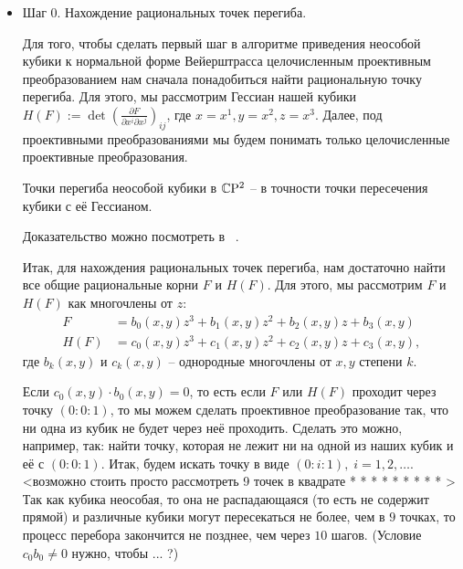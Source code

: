 \begin{itemize}[leftmargin=0.6cm]
    
    \item Шаг 0. Нахождение рациональных точек перегиба. 

    Для того, чтобы сделать первый шаг в алгоритме приведения неособой
    кубики к нормальной форме Вейерштрасса целочисленным проективным
    преобразованием нам сначала понадобиться найти рациональную точку
    перегиба. Для этого, мы рассмотрим Гессиан нашей кубики \(H(F) := \det \left(
    \frac{\partial F}{\partial x^{i} \partial x^{j}}\right)_{ij}\), где \(x =
    x^{1}, y = x^{2}, z = x^{3}\). Далее, под проективными
    преобразованиями мы будем понимать только целочисленные проективные
    преобразования.

    \begin{theoremf}
        Точки перегиба неособой кубики в \(\mathbb{C} \mathrm{P}^2\) -- в точности
        точки пересечения кубики с её Гессианом.
    \end{theoremf}

    Доказательство можно посмотреть в ~\cite{pra_sol}.

    Итак, для нахождения рациональных точек перегиба, нам достаточно найти
    все общие рациональные корни \(F\) и \(H(F)\). Для этого, мы
    рассмотрим \(F\) и \(H(F)\) как многочлены от \(z\):
    \begin{align*}
        F &= b_0(x, y) z^3 + b_1(x, y) z^2 + b_2(x, y) z + b_3(x, y) \\
        H(F) &= c_0(x, y) z^3 + c_1(x, y) z^2 + c_2(x, y) z + c_3(x, y) 
    ,\end{align*}
    где \(b_k(x, y)\) и \(c_k(x, y)\) -- однородные многочлены от \(x, y\) 
    степени \(k\). 

    Если \(c_0(x, y) \cdot b_0(x, y) = 0\), то есть если
    \(F\) или \(H(F)\) проходит через точку \((0 : 0 : 1)\), то мы можем
    сделать проективное преобразование так, что ни одна из кубик не будет
    через неё проходить. Сделать это можно, например, так: найти точку,
    которая не лежит ни на одной из наших кубик и  её
    с \((0 : 0 : 1)\). Итак, будем искать точку в виде \((0 : i : 1), \; i
    = 1, 2, \ldots\). <возможно стоить просто рассмотреть 9 точек в квадрате 
    * * *
    * * *
    * * *
    >
    Так как кубика неособая, то она не распадающаяся (то есть не содержит
    прямой) и различные кубики могут пересекаться не более, чем в \(9\) 
    точках, то процесс перебора закончится не позднее, чем через \(10\) 
    шагов. (Условие \(c_0 b_0 \ne 0\) нужно, чтобы ... ?)


\end{itemize}
